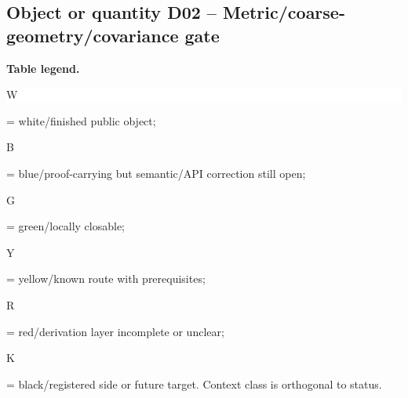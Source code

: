 \subsection*{Object or quantity D02 -- Metric/\allowbreak{}coarse-geometry/\allowbreak{}covariance gate}
\hypertarget{objproof:D02}{}
\par\smallskip\noindent\begin{minipage}{0.99\linewidth}\footnotesize\raggedright\textbf{Table legend.} \colorbox{white}{\strut W} = white/finished public object; \colorbox{cyan!20}{\strut B} = blue/proof-carrying but semantic/API correction still open; \colorbox{green!18}{\strut G} = green/locally closable; \colorbox{yellow!25}{\strut Y} = yellow/known route with prerequisites; \colorbox{red!20}{\strut R} = red/derivation layer incomplete or unclear; \colorbox{black!18}{\strut K} = black/registered side or future target. Context class is orthogonal to status.\end{minipage}\par\vspace{0.25em}

